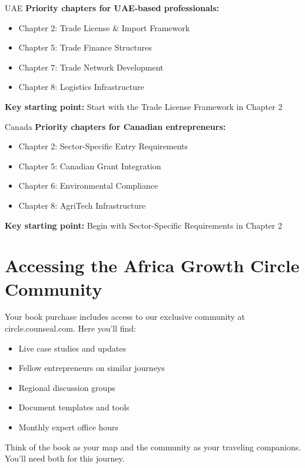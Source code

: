 \begin{regionalbox}{UAE}
\textbf{Priority chapters for UAE-based professionals:}
\begin{itemize}
    \item Chapter 2: Trade License \& Import Framework
    \item Chapter 5: Trade Finance Structures
    \item Chapter 7: Trade Network Development
    \item Chapter 8: Logistics Infrastructure
\end{itemize}

\textbf{Key starting point:} Start with the Trade License Framework in Chapter 2
\end{regionalbox}

\begin{regionalbox}{Canada}
\textbf{Priority chapters for Canadian entrepreneurs:}
\begin{itemize}
    \item Chapter 2: Sector-Specific Entry Requirements
    \item Chapter 5: Canadian Grant Integration
    \item Chapter 6: Environmental Compliance
    \item Chapter 8: AgriTech Infrastructure
\end{itemize}

\textbf{Key starting point:} Begin with Sector-Specific Requirements in Chapter 2
\end{regionalbox}

\section{Accessing the Africa Growth Circle Community}

\begin{communitybox}
Your book purchase includes access to our exclusive community at circle.counseal.com. Here you'll find:
\begin{itemize}
    \item Live case studies and updates
    \item Fellow entrepreneurs on similar journeys
    \item Regional discussion groups
    \item Document templates and tools
    \item Monthly expert office hours
\end{itemize}

Think of the book as your map and the community as your traveling companions. You'll need both for this journey.
\end{communitybox}

